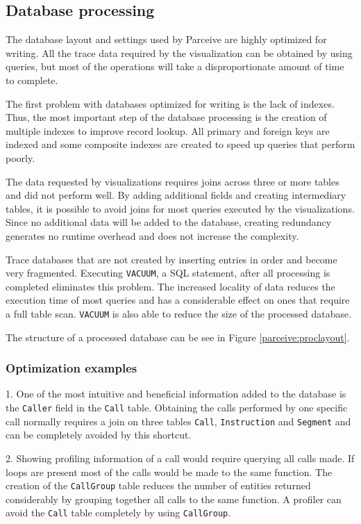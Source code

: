 \subsection{Database processing}
\label{dataprocessing}

The database layout and settings used by Parceive are highly optimized for writing. All the trace data required by the visualization can be obtained by using queries, but most of the operations will take a disproportionate amount of time to complete.

The first problem with databases optimized for writing is the lack of indexes. Thus, the most important step of the database processing is the creation of multiple indexes to improve record lookup. All primary and foreign keys are indexed and some composite indexes are created to speed up queries that perform poorly.

The data requested by visualizations requires joins across three or more tables and did not perform well. By adding additional fields and creating intermediary tables, it is possible to avoid joins for most queries executed by the visualizations. Since no additional data will be added to the database, creating redundancy generates no runtime overhead and does not increase the complexity.

Trace databases that are not created by inserting entries in order and become very fragmented. Executing \texttt{VACUUM}, a SQL statement, after all processing is completed eliminates this problem. The increased locality of data reduces the execution time of most queries and has a considerable effect on ones that require a full table scan. \texttt{VACUUM} is also able to reduce the size of the processed database.

The structure of a processed database can be see in Figure \ref{parceive:proclayout}.

\subsubsection{Optimization examples}

1. One of the most intuitive and beneficial information added to the database is the \texttt{Caller} field in the \texttt{Call} table. Obtaining the calls performed by one specific call normally requires a join on three tables \texttt{Call}, \texttt{Instruction} and \texttt{Segment} and can be completely avoided by this shortcut.

2. Showing profiling information of a call would require querying all calls made. If loops are present most of the calls would be made to the same function. The creation of the \texttt{CallGroup} table reduces the number of entities returned considerably by grouping together all calls to the same function. A profiler can avoid the \texttt{Call} table completely by using \texttt{CallGroup}.

